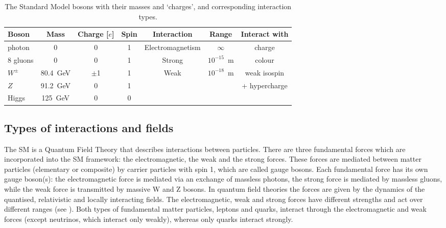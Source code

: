 \begin{table}[h!]
\begin{center}
{
\begin{tabular}{|l|c|c|c|c|c|c|}\cline{1-7}
 Boson & Mass &  Charge [$e$] & Spin  & Interaction & Range & Interact with \\ \hline
    photon  &  0  &  0 & 1 &  Electromagnetism & $ \infty $  &  charge \\ \hline
  8 gluons  &  0  &  0 & 1 &  Strong & $10^{-15}$~m &  colour \\ \hline 
    $W^{\pm}$   &  80.4~GeV  &  $\pm$1 & 1 &  \multirow{2}{*}{Weak}  & \multirow{2}{*}{$10^{-18}$~m} & weak isospin  \\
    $Z$   &  91.2~GeV  &  0 & 1 &  &  & + hypercharge \\ \hline
    Higgs   &  125~GeV  &  0 & 0 &  &  &   \\ 
\hline
\end{tabular}
}
\caption{\label{tab:bosons}The Standard Model bosons with their masses and `charges', and corresponding interaction types. }
\end{center}
\end{table}




\subsection{Types of interactions and fields}

The SM is a Quantum Field Theory that describes interactions between particles.
There are three fundamental forces which are incorporated into the SM framework: the electromagnetic, the weak and the strong forces. These forces are mediated between matter particles (elementary or composite) by carrier particles with spin 1, which are called gauge bosons.
Each fundamental force has its own gauge boson(s): the electromagnetic force is mediated via an exchange of massless photons, the strong force is mediated by massless gluons, while the weak force is transmitted by massive W and Z bosons.
In quantum field theories the forces are given by the dynamics of the quantised, relativistic and locally interacting fields.
The electromagnetic, weak and strong forces have different strengths and act over different ranges (see ). 
Both types of fundamental matter particles, leptons and quarks, interact through the electromagnetic and weak forces (except neutrinos, which interact only weakly), whereas only quarks interact strongly.

